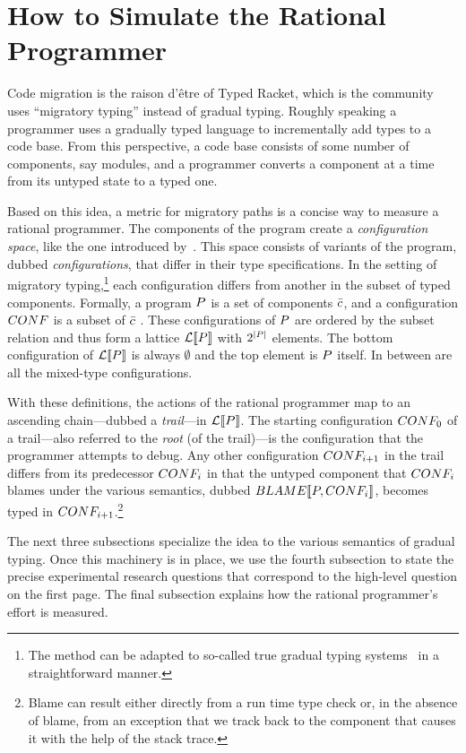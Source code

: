\section{How to Simulate the Rational Programmer} 

Code migration is the raison d'\^etre of Typed Racket, which is the community
uses ``migratory typing'' instead of gradual typing. Roughly speaking a
programmer uses a gradually typed language to incrementally add types to a code
base. From this perspective, a code base consists of some number of components,
say modules, and a programmer converts a component at a time from its untyped
state to a typed one. 

Based on this idea, a metric for migratory paths is a concise way to measure a
rational programmer. The components of the program create a \emph{configuration
space}, like the one introduced by~\citet{tfgnvf-popl-2016}. This space consists
of variants of the program, dubbed \emph{configurations}, that differ in their
type specifications. In the setting of migratory typing,\footnote{The method can
be adapted to so-called true gradual typing systems~\cite{svcb-snapl-2015} in a
straightforward manner.} each configuration differs from another in the subset
of typed components. Formally, a program $P$ is a set of components
$\bar{c}$, and a configuration $CONF$ is a subset of
$\bar{c}$ . These configurations of $P$ are ordered by the subset
relation and thus form a lattice $\mathcal{L}\llbracket P\rrbracket$ with $2^{\mid P \mid}$
elements.  The bottom configuration of $\mathcal{L}\llbracket P\rrbracket$ is always $\emptyset$
and the top element is $P$ itself. In between are all the mixed-type
configurations.

With these definitions, the actions of the rational programmer map to an
ascending chain---dubbed a \emph{trail}---in $\mathcal{L}\llbracket P\rrbracket$.  The starting
configuration $CONF_0$ of a trail---also referred to the \emph{root} (of the
trail)---is the configuration that the programmer attempts to debug. Any other
configuration $CONF_{i+1}$ in the trail differs from its predecessor
$CONF_{i}$ in that the untyped component that $CONF_i$ blames under the
various semantics, dubbed $BLAME\llbracket P, CONF_i\rrbracket$, becomes typed in
$CONF_{i+1}$.\footnote{Blame can result either directly from a run time type
check or, in the absence of blame, from an exception that we track back to the
component that causes it with the help of the stack trace.}

The next three subsections specialize the idea to the various semantics of
gradual typing. Once this machinery is in place, we use the fourth subsection to
state the precise experimental research questions that correspond to the
high-level question on the first page. The final subsection explains how the
rational programmer's effort is measured. 


